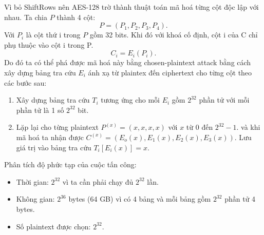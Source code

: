 \begin{loigiai}
\begin{algorithm}[H]
    \caption{AES-128 Encryption without ShiftRows}
  \end{algorithm}
  Vì bỏ ShiftRows nên AES-128 trờ thành thuật toán mã hoá từng cột độc lập với nhau. Ta chia $P$ thành 4 cột:
  \begin{equation}
    P = (P_1, P_2, P_3, P_4).
  \end{equation} Với $P_i$ là cột thứ i trong $P$ gồm 32 bits. Khi đó với khoá cố định, cột i của C chỉ phụ thuộc vào cột i trong P.
  \begin{equation}
    C_i = E_i(P_i).
  \end{equation} Do đó ta có thể phá được mã hoá này bằng chosen-plaintext attack bằng cách xây dựng bảng tra cứu $E_i$ ánh xạ từ plaintex đến ciphertext cho từng cột theo các bước sau:
  \begin{enumerate}
  \item Xây dựng bảng tra cứu $T_i$ tương ứng cho mỗi $E_i$ gồm $2^{32}$ phần tử với mỗi phần tử là 1 số $2^{32}$ bit.
  \item Lặp lại cho từng plaintext $P^{(x)}=(x, x, x, x)$ với $x$ từ $0$ đến $2^{32}-1$. và khi mã hoá ta nhận được $C^{(x)}=(E_o(x), E_1(x), E_2(x), E_3(x))$. Lưu giá trị vào bảng tra cứu $T_i[E_i(x)] = x$.
  \end{enumerate}
  Phân tích độ phức tạp của cuộc tấn công:
  \begin{itemize}
  \item Thời gian: $2^{32}$ vì ta cần phải chạy đủ $2^{32}$ lần.
  \item Không gian: $2^{36}$ bytes (64 GB) vì có 4 bảng và mỗi bảng gồm $2^{32}$ phần tử 4 bytes.
  \item Số plaintext được chọn: $2^{32}$.
  \end{itemize}
\end{loigiai}
